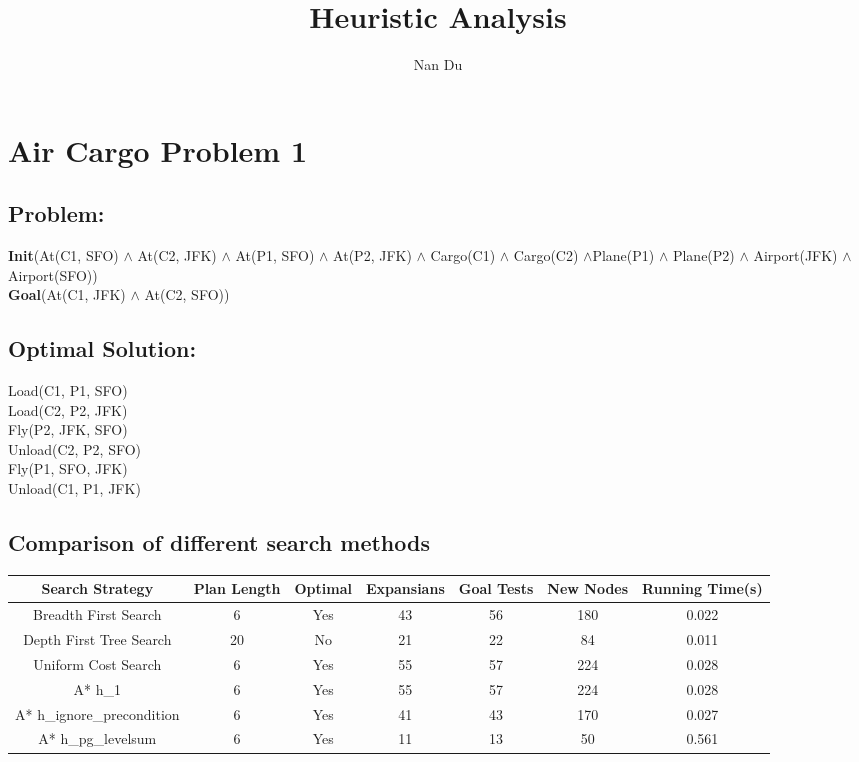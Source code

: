 \documentclass[]{article}
\title{Heuristic Analysis}
\author{Nan Du}
\begin{document}
\maketitle
\section{Air Cargo Problem 1}
\subsection*{Problem:}
\textbf{Init}(At(C1, SFO) $ \wedge $ At(C2, JFK) 
$ \wedge $ At(P1, SFO) $ \wedge $ At(P2, JFK) 
$ \wedge $ Cargo(C1) $ \wedge $ Cargo(C2) 
$ \wedge  $Plane(P1) $ \wedge $ Plane(P2)
$ \wedge $ Airport(JFK) $ \wedge $ Airport(SFO))\\
\textbf{Goal}(At(C1, JFK) $ \wedge $ At(C2, SFO))
\subsection*{Optimal Solution:}
Load(C1, P1, SFO)\\
Load(C2, P2, JFK)\\
Fly(P2, JFK, SFO)\\
Unload(C2, P2, SFO)\\
Fly(P1, SFO, JFK)\\
Unload(C1, P1, JFK)

\subsection*{Comparison of different search methods}
\begin{table}
	\begin{center}
		\begin{adjustbox}{width=1\textwidth}
			\begin{tabular}{ c | c | c | c | c | c | c }
				\hline
				Search Strategy & Plan Length & Optimal & Expansians & Goal Tests & New Nodes & Running Time(s) \\ \hline
				Breadth First Search & 6 & Yes &  43 & 56 & 180 & 0.022 \\ \hline
				Depth First Tree Search & 20 & No &  21 & 22 & 84 & 0.011 \\ \hline
				Uniform Cost Search & 6 & Yes &  55 & 57 & 224 & 0.028 \\ \hline
				A* h\_1 & 6 & Yes &  55 & 57 & 224 & 0.028 \\ \hline
				A* h\_ignore\_precondition & 6 & Yes &  41 & 43 & 170 & 0.027 \\ \hline
				A* h\_pg\_levelsum & 6 & Yes &  11 & 13 & 50 & 0.561 \\
				\hline
			\end{tabular}
		\end{adjustbox}
	\end{center}
\end{table}
\end{document}
